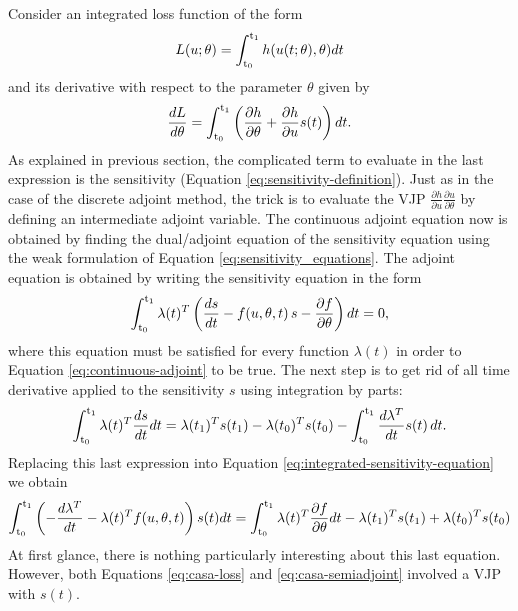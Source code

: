 Consider an integrated loss function of the form 
\begin{equation}
    L(u; \theta) = \operatorname{\int_{t_0}^{t_1}} h(u(t;\theta), \theta) dt
\end{equation}
and its derivative with respect to the parameter $\theta$ given by
\begin{equation}
    \frac{dL}{d\theta}
    = 
    \operatorname{\int_{t_0}^{t_1}} \left( \frac{\partial h}{\partial \theta} + \frac{\partial h}{\partial u} s(t) \right) dt.
    \label{eq:casa-loss}
\end{equation}
As explained in previous section, the complicated term to evaluate in the last expression is the sensitivity (Equation \eqref{eq:sensitivity-definition}).
Just as in the case of the discrete adjoint method, the trick is to evaluate the VJP $\frac{\partial h}{\partial u} \frac{\partial u}{\partial \theta}$ by defining an intermediate adjoint variable. 
The continuous adjoint equation now is obtained by finding the dual/adjoint equation of the sensitivity equation using the weak formulation of Equation \eqref{eq:sensitivity_equations}. 
The adjoint equation is obtained by writing the sensitivity equation in the form 
\begin{equation}
    \operatorname{\int_{t_0}^{t_1}} \lambda(t)^T \left( \frac{ds}{dt} - f(u, \theta, t) \, s - \frac{\partial f}{\partial \theta}  \right) dt 
    = 
    0,
    \label{eq:integrated-sensitivity-equation}
\end{equation}
where this equation must be satisfied for every function $\lambda(t)$ in order to Equation \eqref{eq:continuous-adjoint} to be true. 
The next step is to get rid of all time derivative applied to the sensitivity $s$ using integration by parts: 
\begin{equation}
    \operatorname{\int_{t_0}^{t_1}} \lambda(t)^T \frac{ds}{dt} dt
    = 
    \lambda(t_1)^T s(t_1) - \lambda(t_0)^T s(t_0)
    -
    \operatorname{\int_{t_0}^{t_1}} \frac{d\lambda^T}{dt} s(t)\, dt.
\end{equation}
Replacing this last expression into Equation \eqref{eq:integrated-sensitivity-equation} we obtain 
\begin{equation}
    \operatorname{\int_{t_0}^{t_1}} \left( - \frac{d\lambda^T}{dt} -  \lambda(t)^T f(u, \theta, t) \right) s(t) dt
    =
    \operatorname{\int_{t_0}^{t_1}} \lambda(t)^T \frac{\partial f}{\partial \theta} dt 
    - 
    \lambda(t_1)^T s(t_1)
    + 
    \lambda(t_0)^T s(t_0)
    \label{eq:casa-semiadjoint}
\end{equation}
At first glance, there is nothing particularly interesting about this last equation. 
However, both Equations \eqref{eq:casa-loss} and \eqref{eq:casa-semiadjoint} involved a VJP with $s(t)$. 
